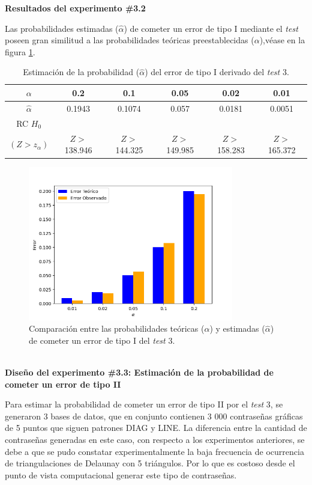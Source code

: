\documentclass[12pt]{report}
\begin{document}
\textbf{Resultados del experimento \#3.2}

Las probabilidades estimadas ($\hat{\alpha}$) de cometer un error de tipo I  mediante el \textit{test} poseen gran similitud  a las probabilidades teóricas preestablecidas ($\alpha$),véase en la figura \ref{Teorico vs Observado3}.
\begin{table}[h!]
	\centering
	\begin{tabular}{|c|ccccc|}
		\hline
		$\alpha$ & 0.2 &   0.1 &  0.05 &  0.02 &  0.01 \\
		\hline
		$\hat{\alpha}$ & 0.1943 & 0.1074 & 0.057 & 0.0181 & 0.0051 \\
		\hline
	RC $H_0$ 		&		&		&		&		&\\
		$(Z>z_\alpha)$&  $Z>$138.946& $Z>$144.325& $Z>$149.985& $Z>$158.283& $Z>$165.372\\	
		\hline
	\end{tabular}
	\caption{Estimación de la probabilidad ($\hat{\alpha}$) del error de tipo I derivado del \textit{test} 3.}
	\label{tab3:error1-prob1}
\end{table}
\begin{figure}[ht]
	\centering
	
	\includegraphics[width=0.8\textwidth]{5td_teo_obs.png}
	\caption{Comparación entre las probabilidades teóricas ($\alpha$) y estimadas ($\hat{\alpha}$) de cometer un error de tipo I del \textit{test} 3. }
	\label{Teorico vs Observado3}
\end{figure}\\

\textbf{Diseño del experimento \#3.3: Estimación de la probabilidad de cometer un error de tipo II}

Para estimar la probabilidad de cometer un error de tipo II por el \textit{test} 3, se generaron 3 bases de datos, que en conjunto contienen 3 000 contraseñas gráficas de 5 puntos que siguen patrones DIAG y LINE. La diferencia entre la cantidad de contraseñas generadas en este caso, con respecto a los experimentos anteriores, se debe a que se pudo constatar experimentalmente la baja frecuencia de ocurrencia de triangulaciones de Delaunay con 5 triángulos. Por lo que es costoso desde el punto de vista computacional generar este tipo de contraseñas.
\end{document}
